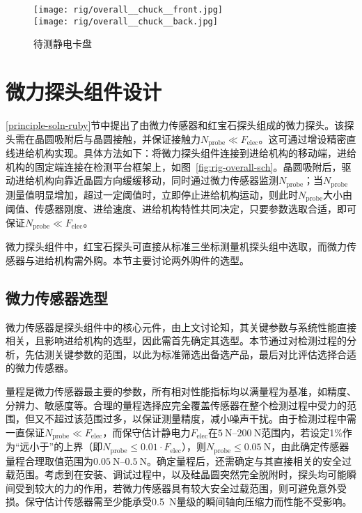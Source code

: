 \begin{figure}[p]
\centering
\texttt{[image: rig/overall\_\_chuck\_\_front.jpg]} \\
\texttt{[image: rig/overall\_\_chuck\_\_back.jpg]}
\caption{待测静电卡盘}
\label{fig:rig-overall-chuck}
\end{figure}



\clearpage



\section{微力探头组件设计}\label{sec:rig-probe}

\ref{principle-soln-ruby}节中提出了由微力传感器和红宝石探头组成的微力探头。该探头需在晶圆吸附后与晶圆接触，并保证接触力$N_{\mathrm{probe}} \ll F_{\mathrm{elec}}$。这可通过增设精密直线进给机构实现。具体方法如下：将微力探头组件连接到进给机构的移动端，进给机构的固定端连接在检测平台框架上，如图~\ref{fig:rig-overall-sch}。晶圆吸附后，驱动进给机构向靠近晶圆方向缓缓移动，同时通过微力传感器监测$N_{\mathrm{probe}}$；当$N_{\mathrm{probe}}$测量值明显增加，超过一定阈值\footnotemark{}时，立即停止进给机构运动，则此时$N_{\mathrm{probe}}$大小由阈值、传感器刚度、进给速度、进给机构特性共同决定，只要参数选取合适，即可保证$N_{\mathrm{probe}} \ll F_{\mathrm{elec}}$。


微力探头组件中，红宝石探头可直接从标准三坐标测量机探头组中选取，而微力传感器与进给机构需外购。本节主要讨论两外购件的选型。


\subsection{微力传感器选型}\label{sec:rig-probe-sensor}

微力传感器是探头组件中的核心元件，由上文讨论知，其关键参数与系统性能直接相关，且影响进给机构的选型，因此需首先确定其选型。本节通过对检测过程的分析，先估测关键参数的范围，以此为标准筛选出备选产品，最后对比评估选择合适的微力传感器。

量程是微力传感器最主要的参数，所有相对性能指标均以满量程为基准，如精度、分辨力、敏感度等。合理的量程选择应完全覆盖传感器在整个检测过程中受力的范围，但又不超过该范围过多，以保证测量精度，减小噪声干扰。由于检测过程中需一直保证$N_{\mathrm{probe}} \ll F_{\mathrm{elec}}$，而保守估计静电力$F_{\mathrm{elec}}$在$\SIrange{5}{200}{\newton}$范围内，若设定1\%作为“远小于”的上界（即$N_{\mathrm{probe}} \leq 0.01 \cdot F_{\mathrm{elec}}$），则$N_{\mathrm{probe}} \leq \SI{0.05}{\newton}$，由此确定传感器量程合理取值范围为$\SIrange{0.05}{0.5}{\newton}$。确定量程后，还需确定与其直接相关的安全过载范围。考虑到在安装、调试过程中，以及硅晶圆突然完全脱附时，探头均可能瞬间受到较大的力的作用，若微力传感器具有较大安全过载范围，则可避免意外受损。保守估计传感器需至少能承受\SI{0.5}{\newton}量级的瞬间轴向压缩力而性能不受影响。

